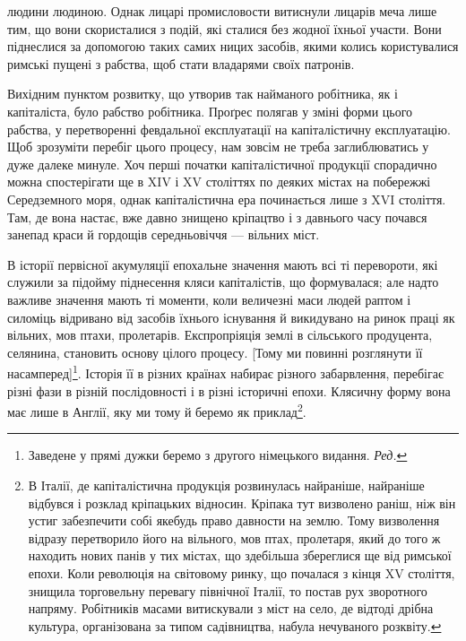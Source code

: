 \parcont{}  %
людини людиною. Однак лицарі промисловости витиснули лицарів
меча лише тим, що вони скористалися з подій, які сталися
без жодної їхньої участи. Вони піднеслися за допомогою таких
самих ницих засобів, якими колись користувалися римські пущені
з рабства, щоб стати владарями своїх патронів.

Вихідним пунктом розвитку, що утворив так найманого робітника,
як і капіталіста, було рабство робітника. Проґрес полягав
у зміні форми цього рабства, у перетворенні февдальної експлуатації
на капіталістичну експлуатацію. Щоб зрозуміти перебіг
цього процесу, нам зовсім не треба заглиблюватись у дуже
далеке минуле. Хоч перші початки капіталістичної продукції
спорадично можна спостерігати ще в XIV і XV століттях по
деяких містах на побережжі Середземного моря, однак капіталістична
ера починається лише з XVI століття. Там, де вона настає,
вже давно знищено кріпацтво і з давнього часу почався
занепад краси й гордощів середньовіччя — вільних міст.

В історії первісної акумуляції епохальне значення мають всі
ті перевороти, які служили за підойму піднесення кляси капіталістів,
що формувалася; але надто важливе значення мають
ті моменти, коли величезні маси людей раптом і силоміць відривано
від засобів їхнього існування й викидувано на ринок праці
як вільних, мов птахи, пролетарів. Експропріяція землі в сільського
продуцента, селянина, становить основу цілого процесу.
[Тому ми повинні розглянути її насамперед]\footnote*{
Заведене у прямі дужки беремо з другого німецького видання. \emph{Ред.}
}. Історія її в
різних країнах набирає різного забарвлення, перебігає різні
фази в різній послідовності і в різні історичні епохи. Клясичну
форму вона має лише в Англії, яку ми тому й беремо як приклад\footnote{
В Італії, де капіталістична продукція розвинулась найраніше,
найраніше відбувся і розклад кріпацьких відносин. Кріпака тут визволено
раніш, ніж він устиг забезпечити собі якебудь право давности на
землю. Тому визволення відразу перетворило його на вільного, мов
птах, пролетаря, який до того ж находить нових панів у тих містах, що
здебільша збереглися ще від римської епохи. Коли революція на світовому
ринку, що почалася з кінця XV століття, знищила торговельну
перевагу північної Італії, то постав рух зворотного напряму. Робітників
масами витискували з міст на село, де відтоді дрібна культура, організована
за типом садівництва, набула нечуваного розквіту.
}.

